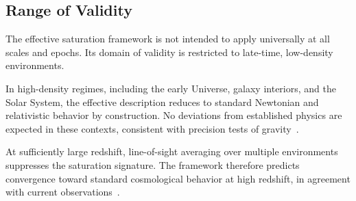 \subsection{Range of Validity}
  \label{subsec:validity}

  The effective saturation framework is not intended to apply universally at all scales and epochs.
  Its domain of validity is restricted to late-time, low-density environments.

  In high-density regimes, including the early Universe, galaxy interiors, and
  the Solar System, the effective description reduces to standard Newtonian and relativistic
  behavior by construction.
  No deviations from established physics are expected in these
  contexts, consistent with precision tests of gravity~\cite{Will2014Tests}.

  At sufficiently large redshift, line-of-sight averaging over multiple
  environments suppresses the saturation signature.
  The framework therefore predicts convergence toward standard cosmological
  behavior at high redshift, in agreement with current observations~\cite{Planck2020}.
